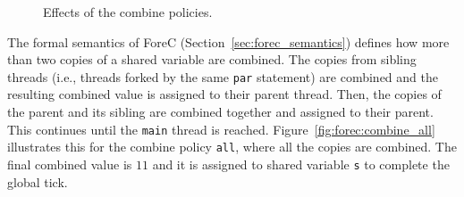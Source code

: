 \begin{figure}
	\centering

	\hfill

	\hspace{3.9cm}
	\hspace{0.8cm}

	\caption{Effects of the combine policies.}
\end{figure}

The formal semantics of ForeC 
(Section~\ref{sec:forec_semantics}) defines how more than two
copies of a shared variable are combined. The 
copies from sibling threads (i.e., threads forked by 
the same \verb$par$ statement) are combined 
and the resulting combined value is assigned to their parent
thread. Then, the copies of the parent and its sibling 
are combined together and assigned to their parent. 
This continues until the \verb$main$ thread is reached.
Figure~\ref{fig:forec:combine_all} illustrates this
for the combine policy \verb$all$, where all the copies 
are combined. The final combined value is $11$ and
it is assigned to shared variable \verb$s$ to 
complete the global tick.

